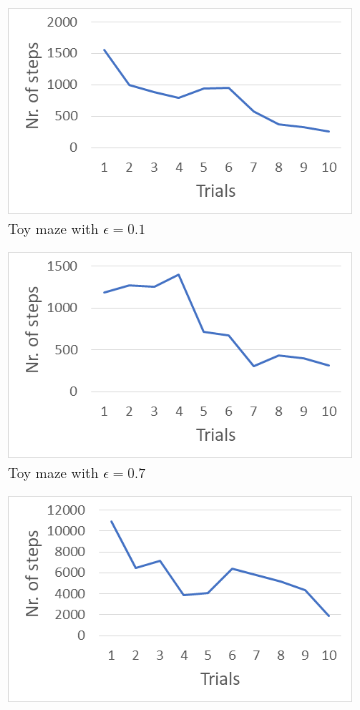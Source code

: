 \begin{figure}[H]
\centering
\begin{subfigure}{.48\textwidth}
  \centering
  \includegraphics[width=0.99\linewidth]{images/2.2training/1Graph3.png}
    \caption{Toy maze with $\epsilon = 0.1$}
    \label{fig:toy_maze_low_epsilon}
\end{subfigure}
\begin{subfigure}{.48\textwidth}
  \centering
  \includegraphics[width=1\linewidth]{images/2.2training/7Graph3.png}
      \caption{Toy maze with  $\epsilon = 0.7$}
    \label{fig:toy_maze_high_epsilon}
\end{subfigure}
\begin{subfigure}{.48\textwidth}
  \centering
  \includegraphics[width=0.99\linewidth]{images/2.2training/0Graph4.png}

\end{subfigure}
\end{figure}
